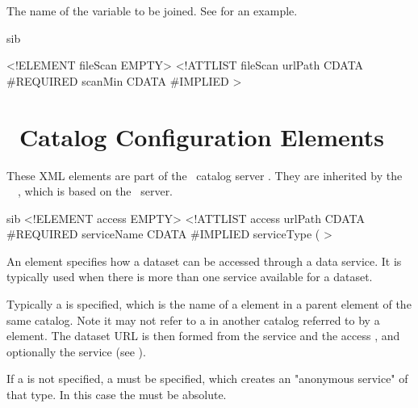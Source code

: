 \begin{description}


The name of the  variable to be joined.  See
 for an example.

\end{description}



\begin{vcode}{sib}

<!ELEMENT fileScan EMPTY>
<!ATTLIST fileScan
    urlPath CDATA #REQUIRED
    scanMin CDATA #IMPLIED
>
\end{vcode}


\section{\thredds\ Catalog Configuration Elements}
\label{agg,thredds-elements}

These XML elements are part of the \thredds\ catalog server \dtd .
They are inherited by the \opendap\ \aggser\ \dtd , which is based on
the \thredds\ server.



\begin{vcode}{sib}
<!ELEMENT access EMPTY>
<!ATTLIST access
    urlPath CDATA #REQUIRED
    serviceName CDATA #IMPLIED
    serviceType (%
>
\end{vcode}

An  element specifies how a dataset can be accessed
through a data service. It is typically used when there is more than
one service available for a dataset.

Typically a  is specified, which is the name of a
 element in a parent element of the same catalog.
Note it may not refer to a  in another catalog
referred to by a  element. The dataset URL is then
formed from the service  and the access , and
optionally the service  (see ).


If a  is not specified, a  must be
specified, which creates an "anonymous service" of that type. In this
case the  must be absolute.



